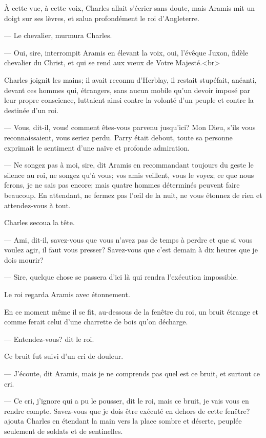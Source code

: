 À cette vue, à cette voix, Charles allait s'écrier sans doute, mais Aramis mit un doigt sur ses lèvres, et salua profondément le roi d'Angleterre.

— Le chevalier, murmura Charles.

— Oui, sire, interrompit Aramis en élevant la voix, oui, l'évêque Juxon, fidèle chevalier du Christ, et qui se rend aux vœux de
Votre Majesté.<br> 

Charles joignit les mains; il avait reconnu d'Herblay, il restait stupéfait, anéanti, devant ces hommes qui, étrangers, sans aucun mobile qu'un devoir imposé par leur propre conscience, luttaient ainsi contre la volonté d'un peuple et contre la destinée d'un roi.

— Vous, dit-il, vous! comment êtes-vous parvenu jusqu'ici? Mon Dieu, s'ils vous reconnaissaient, vous seriez perdu.
Parry était debout, toute sa personne exprimait le sentiment d'une naïve et profonde admiration.

— Ne songez pas à moi, sire, dit Aramis en recommandant toujours du geste le silence au roi, ne songez qu'à vous; vos amis veillent, vous le voyez; ce que nous ferons, je ne sais pas encore; mais quatre hommes déterminés peuvent faire beaucoup. En attendant, ne fermez pas l'œil de la nuit, ne vous étonnez de rien et attendez-vous à tout.

Charles secoua la tête.

— Ami, dit-il, savez-vous que vous n'avez pas de temps à perdre et que si vous voulez agir, il faut vous presser? Savez-vous que c'est demain à dix heures que je dois mourir?

— Sire, quelque chose se passera d'ici là qui rendra l'exécution impossible.

Le roi regarda Aramis avec étonnement.

En ce moment même il se fit, au-dessous de la fenêtre du roi, un bruit étrange et comme ferait celui d'une charrette de bois qu'on décharge.

— Entendez-vous? dit le roi.

Ce bruit fut suivi d'un cri de douleur.

— J'écoute, dit Aramis, mais je ne comprends pas quel est ce bruit, et surtout ce cri.

— Ce cri, j'ignore qui a pu le pousser, dit le roi, mais ce bruit, je vais vous en rendre compte. Savez-vous que je dois être exécuté en dehors de cette fenêtre? ajouta Charles en étendant la main vers la place sombre et déserte, peuplée seulement de soldats et de sentinelles.

